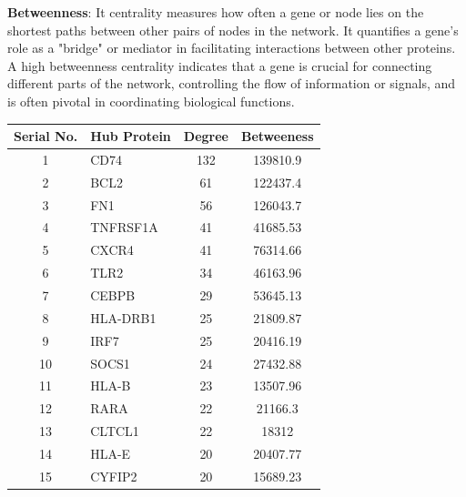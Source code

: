 \textbf{Betweenness}: It centrality measures how often a gene or node lies on the shortest paths between other pairs of nodes in the network. It quantifies a gene's role as a "bridge" or mediator in facilitating interactions between other proteins. A high betweenness centrality indicates that a gene is crucial for connecting different parts of the network, controlling the flow of information or signals, and is often pivotal in coordinating biological functions.\\

\begin{table}[H]
    \centering
    \small
    \renewcommand{\arraystretch}{1.2} %
    \begin{tabular}{|c|p{2.5cm}|c|c|}
        \hline
        Serial No. & Hub Protein & Degree & Betweeness \\
        \hline
        1 & CD74 & 132 & 139810.9 \\
        \hline
        2 & BCL2 & 61 & 122437.4 \\
        \hline
        3 & FN1 & 56 & 126043.7 \\
        \hline
        4 & TNFRSF1A & 41 & 41685.53 \\
        \hline
        5 & CXCR4 & 41 & 76314.66 \\
        \hline
        6 & TLR2 & 34 & 46163.96 \\
        \hline
        7 & CEBPB & 29 & 53645.13 \\
        \hline
        8 & HLA-DRB1 & 25 & 21809.87 \\
        \hline
        9 & IRF7 & 25 & 20416.19 \\
        \hline
        10 & SOCS1 & 24 & 27432.88 \\
        \hline
        11 & HLA-B & 23 & 13507.96 \\
        \hline
        12 & RARA & 22 & 21166.3 \\
        \hline
        13 & CLTCL1 & 22 & 18312 \\
        \hline
        14 & HLA-E & 20 & 20407.77 \\
        \hline
        15 & CYFIP2 & 20 & 15689.23 \\
        \hline
    \end{tabular}
    
    \label{tab:hub_protein_ppi}
\end{table}

